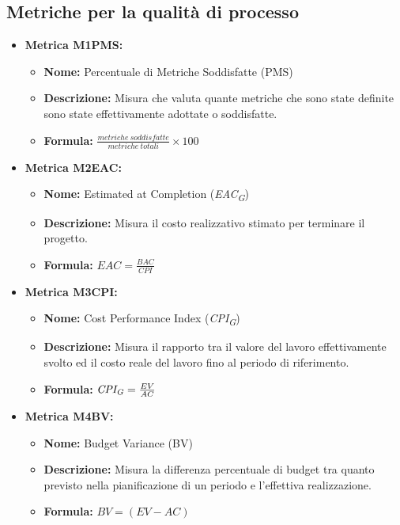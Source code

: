 \subsection{Metriche per la qualità di processo}
\begin{itemize}
    \item \textbf{Metrica M1PMS:}
           \begin{itemize}
            \item \textbf{Nome:} Percentuale di Metriche Soddisfatte (PMS)
            \item \textbf{Descrizione:} Misura che valuta quante metriche che sono state definite sono state effettivamente adottate o soddisfatte.
            \item \textbf{Formula:} $\frac{metriche \ soddisfatte}{metriche \ totali}\times 100$
           \end{itemize}

    \item \textbf{Metrica M2EAC:}
          \begin{itemize}
              \item \textbf{Nome:} Estimated at Completion (\textit{EAC}\textsubscript{\textit{G}})
              \item \textbf{Descrizione:} Misura il costo realizzativo stimato per terminare il progetto.
              \item \textbf{Formula:} $EAC = \frac{BAC}{CPI}$
          \end{itemize}

    \item \textbf{Metrica M3CPI:}
          \begin{itemize}
              \item \textbf{Nome:} Cost Performance Index (\textit{CPI}\textsubscript{\textit{G}})
              \item \textbf{Descrizione:} Misura il rapporto tra il valore del lavoro effettivamente svolto ed il costo reale del lavoro fino al periodo di riferimento.
              \item \textbf{Formula:} $\textit{CPI}\textsubscript{\textit{G}} = \frac{EV}{AC}$
          \end{itemize}

    \item \textbf{Metrica M4BV:}
          \begin{itemize}
              \item \textbf{Nome:} Budget Variance (BV)
              \item \textbf{Descrizione:} Misura la differenza percentuale di budget tra quanto previsto nella pianificazione di un periodo e l’effettiva realizzazione.
              \item \textbf{Formula:} $BV = (EV-AC)$
          \end{itemize}


\end{itemize}

